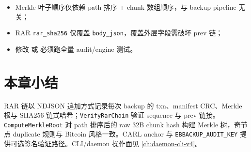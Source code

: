 \begin{invariantbox}[审计不变量]
\begin{itemize}[nosep]
  \item Merkle 叶子顺序仅依赖 path 排序 + chunk 数组顺序，与 backup pipeline 无关；
  \item RAR \texttt{rar\_sha256} 仅覆盖 \texttt{body\_json}，覆盖外层字段需破坏 prev 链；
  \item 修改  或  必须跑全量 audit/engine 测试。
\end{itemize}
\end{invariantbox}

\section{本章小结}

RAR 链以 NDJSON 追加方式记录每次 backup 的 txn、manifest CRC、Merkle 根与 SHA256 链式哈希；\texttt{VerifyRarChain} 验证 sequence 与 prev 链接。\texttt{ComputeMerkleRoot} 对 path 排序后的 raw 32B chunk hash 构建 Merkle 树，奇节点 duplicate 规则与 Bitcoin 风格一致。CARL anchor 与 \texttt{EBBACKUP\_AUDIT\_KEY} 提供可选签名验证路径。CLI/daemon 操作面见 \cref{ch:daemon-cli-v4}。
